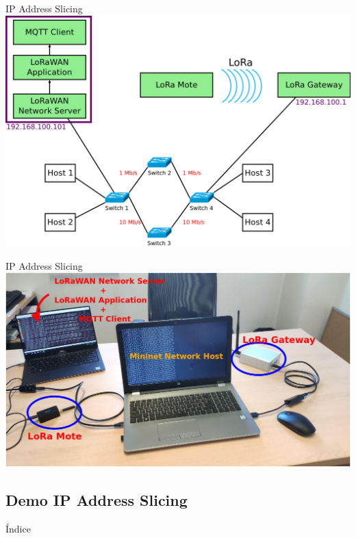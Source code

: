 \documentclass{beamer}
\begin{document}
\begin{frame}{IP Address Slicing}
    \centering
    \includegraphics[scale=0.155]{mininet_topology_LoRa.png}
\end{frame}

\begin{frame}{IP Address Slicing}
    \centering
    \includegraphics[scale=0.23]{lora_setup.png}
\end{frame}

\subsection{Demo IP Address Slicing}
\begin{frame}{Índice}
    \begin{columns}[t]
        \begin{column}{1.7in}
            \tableofcontents[currentsection, subsectionstyle=show/shaded/hide, sections={1-4}]
        \end{column}
        \begin{column}{1.7in}
            \tableofcontents[currentsection, subsectionstyle=show/shaded/hide, sections={5-7}]
        \end{column}
    \end{columns}
\end{frame}
\end{document}
